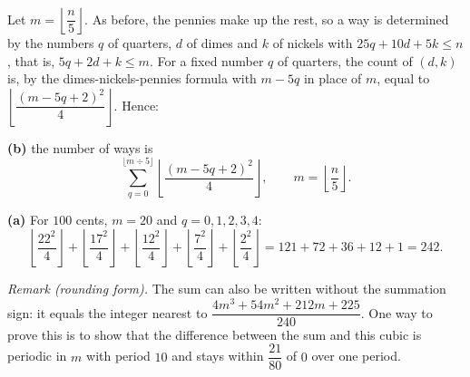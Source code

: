 Let $m=\left\lfloor\dfrac {n}{5}\right\rfloor$. As before, the pennies make up the rest, so a way is determined by the numbers $q$ of quarters, $d$ of dimes and $k$ of nickels with $25q+10d+5k\le n$, that is, $5q+2d+k\le m$. For a fixed number $q$ of quarters, the count of $(d,k)$ is, by the dimes-nickels-pennies formula with $m-5q$ in place of $m$, equal to $\left\lfloor\dfrac{(m-5q+2)^2}{4}\right\rfloor$. Hence:

\textbf{(b)} the number of ways is
\[\boxed{\sum_{q=0}^{\lfloor m\div5\rfloor}\left\lfloor\dfrac{(m-5q+2)^2}{4}\right\rfloor},\qquad m=\left\lfloor\dfrac {n}{5}\right\rfloor .\]

\textbf{(a)} For $100$ cents, $m=20$ and $q=0,1,2,3,4$:
\[\left\lfloor\dfrac{22^2}{4}\right\rfloor+\left\lfloor\dfrac{17^2}{4}\right\rfloor+\left\lfloor\dfrac{12^2}{4}\right\rfloor+\left\lfloor\dfrac{7^2}{4}\right\rfloor+\left\lfloor\dfrac{2^2}{4}\right\rfloor=121+72+36+12+1=\boxed{242}.\]

\emph{Remark (rounding form).} The sum can also be written without the summation sign: it equals the integer nearest to $\dfrac{4m^3+54m^2+212m+225}{240}$. One way to prove this is to show that the difference between the sum and this cubic is periodic in $m$ with period $10$ and stays within $\dfrac{21}{80}$ of $0$ over one period.
